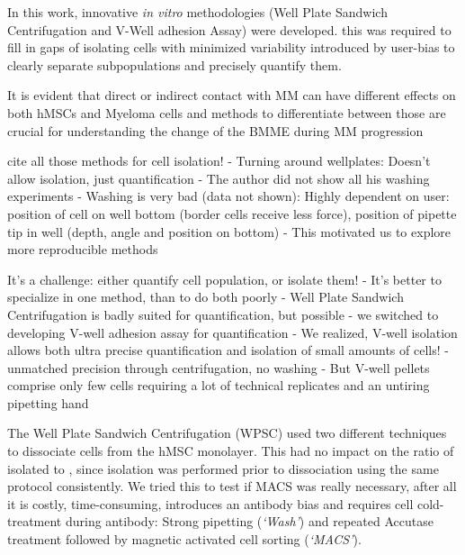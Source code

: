 %
\label{sec:discussion_conclusion_microscopy}%




%
\label{sec:discussion_novel_methods}%

In this work, innovative \textit{in vitro} methodologies (Well Plate Sandwich
Centrifugation and V-Well adhesion Assay) were developed. this was required to
fill in gaps of isolating cells with minimized variability introduced by
user-bias to clearly separate subpopulations and precisely quantify them.


It is evident that direct or indirect contact with MM can have different effects
on both hMSCs and Myeloma cells and methods to differentiate between those are
crucial for understanding the change of the \ac{BMME} during \ac{MM} progression
\cite{fairfieldMultipleMyelomaCells2020, dziadowiczBoneMarrowStromaInduced2022}

cite all those methods for cell isolation!
- Turning around wellplates: Doesn't allow isolation, just quantification
- The author did not show all his washing experiments
- Washing is very bad (data not shown): Highly dependent on user:
position of cell on well bottom (border cells receive less force), position of
pipette tip in well (depth, angle and position on bottom)
- This motivated us to explore more reproducible methods

It's a challenge: either quantify cell population, or isolate them!
- It's better to specialize in one method, than to do both poorly
- Well Plate Sandwich Centrifugation is badly suited for quantification, but possible
- we switched to developing V-well adhesion assay for quantification
- We realized, V-well isolation allows both ultra precise quantification and
isolation of small amounts of cells!
- unmatched precision through centrifugation, no washing
- But V-well pellets comprise only few cells requiring a lot of technical
replicates and an untiring pipetting hand %


The Well Plate
Sandwich Centrifugation (WPSC) used two different techniques to dissociate
\MAina cells from the hMSC monolayer. This had no impact on the ratio of
isolated \MAina to \nMAina, since \nMAina isolation was performed prior to
dissociation using the same protocol consistently. We tried this to test if MACS
was really necessary, after all it is costly, time-consuming, introduces an antibody bias
and requires cell cold-treatment during antibody: Strong pipetting
(\emph{`Wash'}) and repeated Accutase treatment followed by magnetic activated
cell sorting (\emph{`MACS'}).

